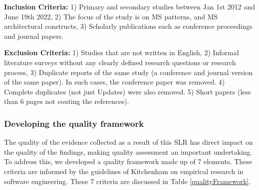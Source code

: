 \documentclass{bmcart}
\begin{document}
\textbf{Inclusion Criteria:} 1) Primary and secondary studies between Jan 1st 2012 and June 19th 2022, 2) The focus of the study is on MS patterns, and MS architectural constructs, 3) Scholarly publications such as conference proceedings and journal papers.

\textbf{Exclusion Criteria:} 1) Studies that are not written in English, 2) Informal literature surveys without any clearly defined research questions or research process, 3) Duplicate reports of the same study (a conference and journal version of the same paper). In such cases, the conference paper was removed. 4) Complete duplicates (not just Updates) were also removed. 5) Short papers (less than 6 pages not couting the references).

\subsubsection{Developing the quality framework}

The quality of the evidence collected as a result of this SLR has direct impact on the quality of the findings, making quality assessment an important undertaking. To address this, we developed a quality framework made up of 7 elements. These criteria are informed by the guidelines of Kitchenham \cite{Kitchenham.2004} on empirical research in software engineering. These 7 criteria are discussed in Table \ref{qualityFramework}.
\end{document}
